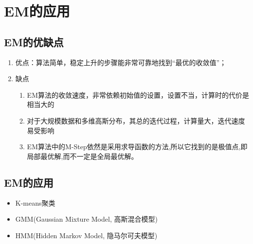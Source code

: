 \documentclass[12pt]{article}
\begin{document}
\section{EM的应用}

\subsection{EM的优缺点}
\begin{enumerate}
	\item 优点：算法简单，稳定上升的步骤能非常可靠地找到“最优的收敛值”；
	\item 缺点
	\begin{enumerate}
		\item EM算法的收敛速度，非常依赖初始值的设置，设置不当，计算时的代价是相当大的
		\item 对于大规模数据和多维高斯分布，其总的迭代过程，计算量大，迭代速度易受影响
		\item EM算法中的M-Step依然是采用求导函数的方法,所以它找到的是极值点,即局部最优解,而不一定是全局最优解。
	\end{enumerate}
\end{enumerate}

\subsection{EM的应用}
\begin{itemize}
	\item K-means聚类
	\item GMM(Gaussian Mixture Model, 高斯混合模型)
	\item HMM(Hidden Markov Model, 隐马尔可夫模型)
\end{itemize}



\end{document}
